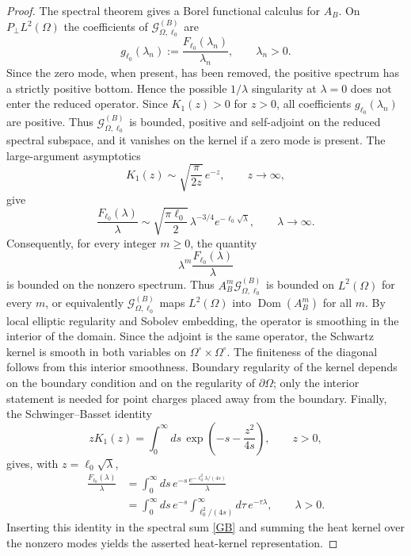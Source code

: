\documentclass[nopacs,amsmath,amsfonts,amssymb,aps,superscriptaddress]{revtex4}
\begin{document}
\begin{proof}
The spectral theorem gives a Borel functional calculus for $A_B$. On $P_\perp L^2(\Omega)$ the coefficients of $\mathcal G_{\Omega,\ell_0}^{(B)}$ are
\begin{equation}
  g_{\ell_0}(\lambda_n)
  :=\frac{F_{\ell_0}(\lambda_n)}{\lambda_n},
  \qquad \lambda_n>0.
\end{equation}
Since the zero mode, when present, has been removed, the positive spectrum has a strictly positive bottom. Hence the possible $1/\lambda$ singularity at $\lambda=0$ does not enter the reduced operator. Since $K_1(z)>0$ for $z>0$, all coefficients $g_{\ell_0}(\lambda_n)$ are positive. Thus $\mathcal G_{\Omega,\ell_0}^{(B)}$ is bounded, positive and self-adjoint on the reduced spectral subspace, and it vanishes on the kernel if a zero mode is present. The large-argument asymptotics \cite{Abramowitz1972}
\begin{equation}
  K_1(z)\sim\sqrt{\frac{\pi}{2z}}\,e^{-z},
  \qquad z\to\infty,
\end{equation}
give
\begin{equation}
  \frac{F_{\ell_0}(\lambda)}{\lambda}
  \sim
  \sqrt{\frac{\pi\ell_0}{2}}\,\lambda^{-3/4}e^{-\ell_0\sqrt{\lambda}},
  \qquad \lambda\to\infty.
\end{equation}
Consequently, for every integer $m\geq0$, the quantity
\begin{equation}
  \lambda^m\frac{F_{\ell_0}(\lambda)}{\lambda}
\end{equation}
is bounded on the nonzero spectrum. Thus $A_B^m\mathcal G_{\Omega,\ell_0}^{(B)}$ is bounded on $L^2(\Omega)$ for every $m$, or equivalently $\mathcal G_{\Omega,\ell_0}^{(B)}$ maps $L^2(\Omega)$ into $\operatorname{Dom}(A_B^m)$ for all $m$. By local elliptic regularity and Sobolev embedding, the operator is smoothing in the interior of the domain. Since the adjoint is the same operator, the Schwartz kernel is smooth in both variables on $\Omega^\circ\times\Omega^\circ$. The finiteness of the diagonal follows from this interior smoothness. Boundary regularity of the kernel depends on the boundary condition and on the regularity of $\partial\Omega$; only the interior statement is needed for point charges placed away from the boundary. Finally, the Schwinger--Basset identity \cite{GradshteynRyzhik2014}
\begin{equation}
  zK_1(z)=\int_0^\infty ds\,\exp\!\left(-s-\frac{z^2}{4s}\right),
  \qquad z>0,
\end{equation}
gives, with $z=\ell_0\sqrt{\lambda}$,
\begin{align}
  \frac{F_{\ell_0}(\lambda)}{\lambda}
  &=\int_0^\infty ds\,e^{-s}
  \frac{e^{-\ell_0^2\lambda/(4s)}}{\lambda}
  \nonumber\\
  &=\int_0^\infty ds\,e^{-s}
  \int_{\ell_0^2/(4s)}^\infty d\tau\,e^{-\tau\lambda},
  \qquad \lambda>0.
\end{align}
Inserting this identity in the spectral sum \eqref{GB} and summing the heat kernel over the nonzero modes yields the asserted heat-kernel representation.
\end{proof}
\end{document}
